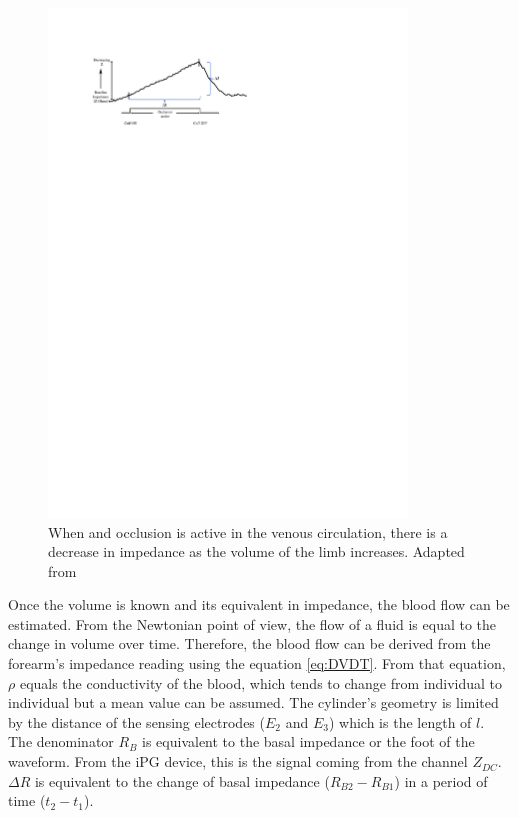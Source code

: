 \begin{figure}[!htpb]
	\centering
	\includegraphics[width=0.85\textwidth,keepaspectratio]{figure_Z_change}
	\caption[Change of baseline impedance during a venous occlusion]{When and occlusion is active in the venous circulation, there is a decrease in impedance as the volume of the limb increases. Adapted from \cite{golden1986assessment}}
	\label{fig:impedance decrease}
\end{figure}

Once the volume is known and its equivalent in impedance, the blood flow can be estimated. From the Newtonian point of view, the flow of a fluid is equal to the change in volume over time. Therefore, the blood flow can be derived from the forearm's impedance reading using the equation \ref{eq:DVDT}. From that equation, $\rho$ equals the conductivity of the blood, which tends to change from individual to individual but a mean value can be assumed. The cylinder's geometry is limited by the distance of the sensing electrodes ($E_2$ and $E_3$) which is the length of $l$. The denominator $R_B$ is equivalent to the basal impedance or the foot of the waveform. From the iPG device, this is the signal coming from the channel $Z_{DC}$. $\Delta R$ is equivalent to the change of basal impedance ($R_{B2} - R_{B1}$) in a period of time ($t_2 - t_1$).  

